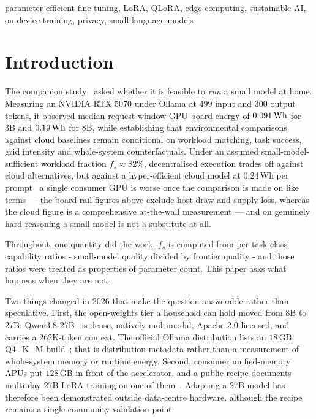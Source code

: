 \documentclass[conference]{IEEEtran}
\newcommand{\Wh}{\,\text{Wh}}
\newcommand{\fs}{f_{s}}
\begin{document}
\begin{IEEEkeywords}
parameter-efficient fine-tuning, LoRA, QLoRA, edge computing, sustainable AI,
on-device training, privacy, small language models
\end{IEEEkeywords}

\section{Introduction}

The companion study~\cite{autoyou2026edge} asked whether it is feasible to
\emph{run} a small model at home. Measuring an NVIDIA RTX 5070 under Ollama at
499 input and 300 output tokens, it observed median request-window GPU board
energy of $\RtxThreeEnergy\Wh$ for 3B and $\RtxEightEnergy\Wh$ for 8B, while establishing that
environmental comparisons against cloud baselines remain conditional on workload
matching, task success, grid intensity and whole-system counterfactuals. Under an
assumed small-model-sufficient workload fraction $\fs \approx 82\%$, decentralised
execution trades off against cloud alternatives, but against a hyper-efficient
cloud model at $0.24\Wh$ per prompt~\cite{elsworth2025} a single consumer GPU
is worse once the comparison is made on like terms --- the board-rail figures
above exclude host draw and supply loss, whereas the cloud figure is a
comprehensive at-the-wall measurement --- and on genuinely hard reasoning a
small model is not a substitute at all.

Throughout, one quantity did the work. $\fs$ is computed from per-task-class
capability ratios - small-model quality divided by frontier quality - and
those ratios were treated as properties of parameter count. This paper asks
what happens when they are not.

Two things changed in 2026 that make the question answerable rather than
speculative. First, the open-weights tier a household can hold moved from 8B to
27B: Qwen3.8-27B~\cite{qwen38_2026} is dense, natively multimodal, Apache-2.0
licensed, and carries a 262K-token context. The official Ollama distribution
lists an $18$\,GB Q4\_K\_M build~\cite{qwen38_ollama2026}; that is distribution
metadata rather than a measurement of whole-system memory or runtime energy.
Second, consumer unified-memory APUs put $128$\,GB in front of the
accelerator, and a public recipe documents multi-day 27B LoRA training on one
of them~\cite{strixhalo2026}. Adapting a 27B model has therefore been
demonstrated outside data-centre hardware, although the recipe remains a
single community validation point.
\end{document}
